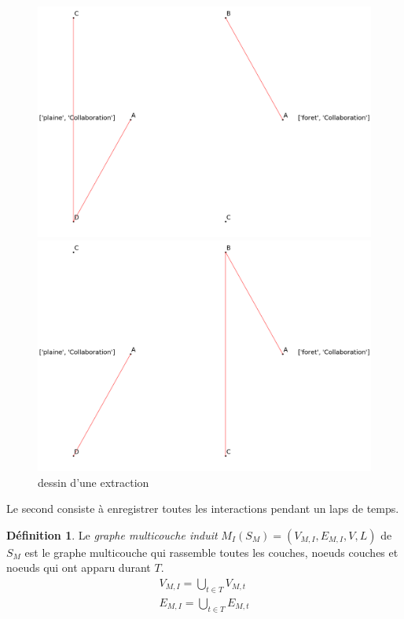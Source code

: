 \documentclass[11pt,a4paper]{article}
\theoremstyle{definition}
\newtheorem{defn}{Définition}
\theoremstyle{remark}
\theoremstyle{remark}
\def \stgm {stream graph multicouche}
\begin{document}
	\begin{figure}[H]
		\begin{minipage}{0.45\linewidth}
			\captionsetup{margin=10pt}
			\includegraphics[width=\textwidth]{extrt4ex.png}
			\caption{Extraction du \stgm{} \ref{exstgm} au temps $t=4$}
		\end{minipage}
		\begin{minipage}{0.45\linewidth}
			\captionsetup{margin=10pt}
			\includegraphics[width=\textwidth]{extrt7ex.png}
			\caption{Extraction du \stgm{} \ref{exstgm} au temps $t=7$}
		\end{minipage}
		\caption{dessin d'une extraction}
	\end{figure}

    Le second consiste à \og enregistrer \fg{} toutes les interactions pendant un laps de temps.
    \begin{defn}
    Le {\em graphe multicouche induit} $M_I(S_M) = (V_{M,I}, E_{M,I}, V,L)$ de $S_M$ est le graphe multicouche qui rassemble toutes les couches, noeuds couches et noeuds qui ont apparu durant $T$.
    \begin{align*}
    	V_{M,I} = \bigcup_{t\in T} V_{M,t}\\
    	E_{M,I} = \bigcup_{t\in T} E_{M,t}\\
    \end{align*}
    \end{defn}
    
\end{document}
